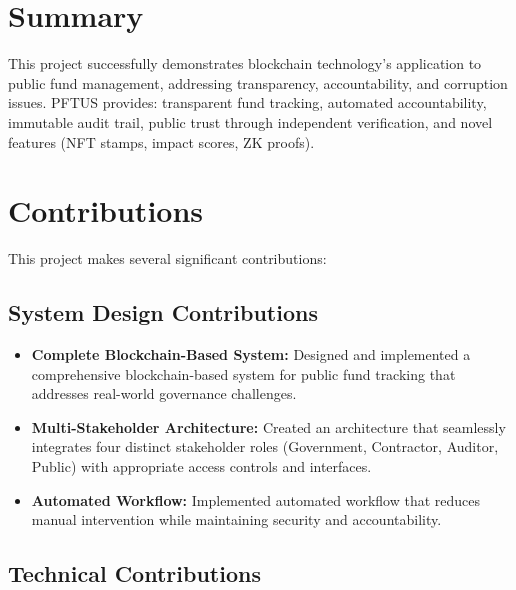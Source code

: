 \documentclass[12pt,a4wide]{report}
\theoremstyle{plain}
\theoremstyle{definition}
\theoremstyle{remark}
\begin{document}
\section{Summary}

This project successfully demonstrates blockchain technology's application to public fund management, addressing transparency, accountability, and corruption issues. PFTUS provides: transparent fund tracking, automated accountability, immutable audit trail, public trust through independent verification, and novel features (NFT stamps, impact scores, ZK proofs).

\section{Contributions}

This project makes several significant contributions:

\subsection{System Design Contributions}

\begin{itemize}
    \item \textbf{Complete Blockchain-Based System:} Designed and implemented a comprehensive blockchain-based system for public fund tracking that addresses real-world governance challenges.
    
    \item \textbf{Multi-Stakeholder Architecture:} Created an architecture that seamlessly integrates four distinct stakeholder roles (Government, Contractor, Auditor, Public) with appropriate access controls and interfaces.
    
    \item \textbf{Automated Workflow:} Implemented automated workflow that reduces manual intervention while maintaining security and accountability.
\end{itemize}

\subsection{Technical Contributions}
\end{document}
